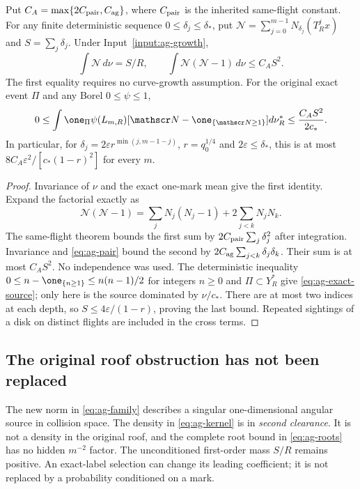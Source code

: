 \begin{corollary}
\label{cor:ag-record}
Put $C_A=\max\{2C_{\rm pair},C_{\rm ag}\}$, where $C_{\rm pair}$
is the inherited same-flight constant. For any finite deterministic
sequence $0\le\delta_j\le\delta_*$, put
$\mathscr N=\sum_{j=0}^{m-1}N_{\delta_j}(T_R^jx)$ and
$S=\sum_j\delta_j$. Under Input~\ref{input:ag-growth},
\begin{equation}\label{eq:ag-factorial}
 \int\mathscr N\,d\nu=S/R,\qquad
 \int\mathscr N(\mathscr N-1)\,d\nu\le C_A S^2.
\end{equation}
The first equality requires no curve-growth assumption. For the
original exact event $\Pi$ and any Borel $0\le\psi\le1$,
\begin{equation}\label{eq:ag-exact-source}
 0\le\int\one_\Pi\psi(L_{m,R})
          [\mathscr N-\one_{\{\mathscr N\ge1\}}]d\nu_R^*
              \le\frac{C_A S^2}{2c_*}.
\end{equation}
In particular, for $\delta_j=2\varepsilon r^{\min(j,m-1-j)}$,
$r=q_0^{1/4}$ and $2\varepsilon\le\delta_*$, this is at most
$8C_A\varepsilon^2/[c_*(1-r)^2]$ for every $m$.
\end{corollary}
\begin{proof}
Invariance of $\nu$ and the exact one-mark mean give the first
identity. Expand the factorial exactly as
\[
 \mathscr N(\mathscr N-1)=\sum_jN_j(N_j-1)
                         +2\sum_{j<k}N_jN_k.
\]
The same-flight theorem bounds the first sum by
$2C_{\rm pair}\sum_j\delta_j^2$ after integration. Invariance
and \eqref{eq:ag-pair} bound the second by
$2C_{\rm ag}\sum_{j<k}\delta_j\delta_k$. Their sum is at most
$C_A S^2$. No independence was used. The deterministic inequality
$0\le n-\one_{\{n\ge1\}}\le n(n-1)/2$ for integers $n\ge0$
and $\Pi\subset Y_R^*$ give \eqref{eq:ag-exact-source}; only here
is the source dominated by $\nu/c_*$. There are at most two
indices at each depth, so $S\le4\varepsilon/(1-r)$, proving the
last bound. Repeated sightings of a disk on distinct flights are
included in the cross terms.
\end{proof}

\subsection{The original roof obstruction has not been replaced}
The new norm in \eqref{eq:ag-family} describes a singular
one-dimensional angular source in collision space. The density
in \eqref{eq:ag-kernel} is in \emph{second clearance}. It is not
a density in the original roof, and the complete root bound in
\eqref{eq:ag-roots} has no hidden $m^{-2}$ factor. The unconditioned
first-order mass $S/R$ remains positive. An exact-label selection
can change its leading coefficient; it is not replaced by a
probability conditioned on a mark.

